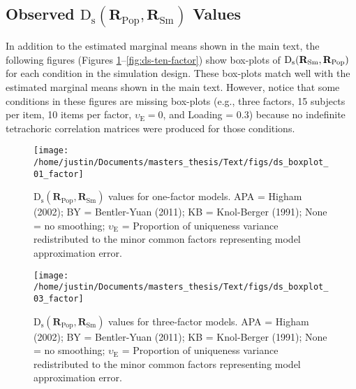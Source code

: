 \documentclass[
  english,
  man]{apa6}
\begin{document}
\begin{appendix}
\pagebreak

\hypertarget{observed-textrmd_textrmsmathbfr_textrmpop-mathbfr_textrmsm-values}{%
\subsection{\texorpdfstring{Observed
\(\textrm{D}_{\textrm{s}}(\mathbf{R}_{\textrm{Pop}}, \mathbf{R}_{\textrm{Sm}})\)
Values}{Observed \textbackslash textrm\{D\}\_\{\textbackslash textrm\{s\}\}(\textbackslash mathbf\{R\}\_\{\textbackslash textrm\{Pop\}\}, \textbackslash mathbf\{R\}\_\{\textbackslash textrm\{Sm\}\}) Values}}\label{observed-textrmd_textrmsmathbfr_textrmpop-mathbfr_textrmsm-values}}

In addition to the estimated marginal means shown in the main text, the
following figures (Figures
\ref{fig:ds-one-factor}--\ref{fig:ds-ten-factor}) show box-plots of
\(\mathrm{D}_{\mathrm{s}}(\mathbf{R}_{\textrm{Sm}}, \mathbf{R}_{\textrm{Pop}})\) for each condition in the simulation design. These box-plots
match well with the estimated marginal means shown in the main text.
However, notice that some conditions in these figures are missing
box-plots (e.g., three factors, 15 subjects per item, 10 items per
factor, \(\upsilon_\textrm{E} = 0\), and Loading = 0.3) because no
indefinite tetrachoric correlation matrices were produced for those
conditions.

\begin{figure}

{\centering \texttt{[image: /home/justin/Documents/masters\_thesis/Text/figs/ds\_boxplot\_01\_factor]} 

}

\caption{$\textrm{D}_{\textrm{s}}(\mathbf{R}_{\textrm{Pop}}, \mathbf{R}_{\textrm{Sm}})$ values for one-factor models. APA = Higham (2002); BY = Bentler-Yuan (2011); KB = Knol-Berger (1991); None = no smoothing; $\upsilon_{\textrm{E}}$ = Proportion of uniqueness variance redistributed to the minor common factors representing model approximation error.}\label{fig:ds-one-factor}
\end{figure}

\begin{figure}

{\centering \texttt{[image: /home/justin/Documents/masters\_thesis/Text/figs/ds\_boxplot\_03\_factor]} 

}

\caption{$\textrm{D}_{\textrm{s}}(\mathbf{R}_{\textrm{Pop}}, \mathbf{R}_{\textrm{Sm}})$ values for three-factor models. APA = Higham (2002); BY = Bentler-Yuan (2011); KB = Knol-Berger (1991); None = no smoothing; $\upsilon_{\textrm{E}}$ = Proportion of uniqueness variance redistributed to the minor common factors representing model approximation error.}\label{fig:ds-three-factor}
\end{figure}


\end{appendix}
\end{document}
